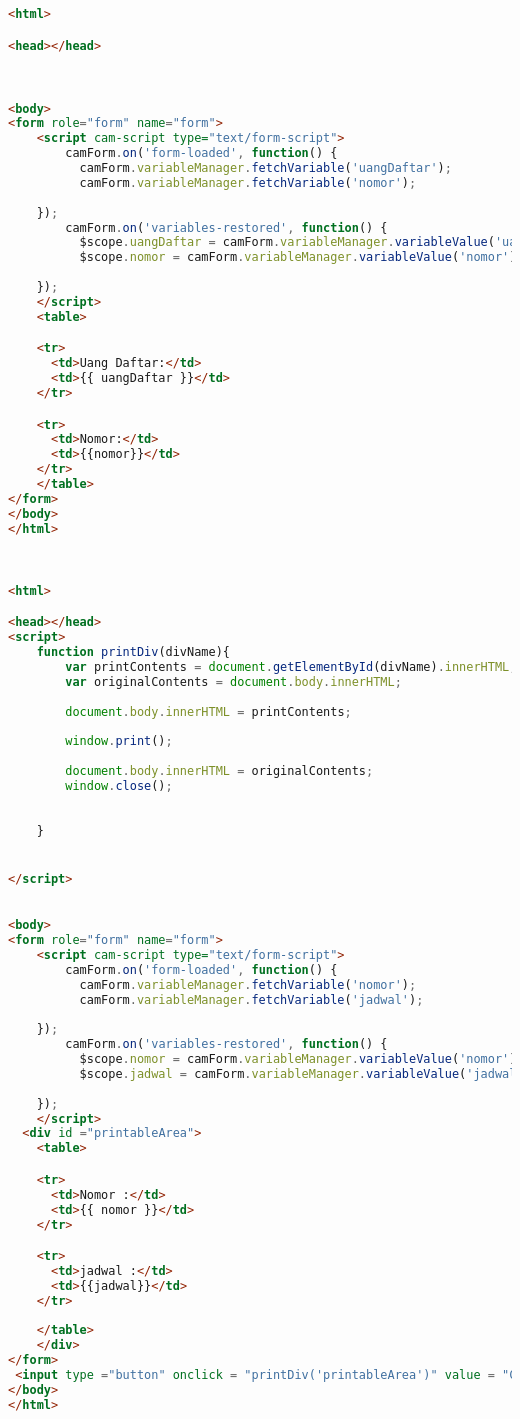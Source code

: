 \begin{lstlisting}[language=html,basicstyle=\tiny,caption=nomor-pembayaran.html]
<html>

<head></head>


	
<body>
<form role="form" name="form">
	<script cam-script type="text/form-script">
    	camForm.on('form-loaded', function() {
	      camForm.variableManager.fetchVariable('uangDaftar');
	      camForm.variableManager.fetchVariable('nomor');
	      
    });
    	camForm.on('variables-restored', function() {
	      $scope.uangDaftar = camForm.variableManager.variableValue('uangDaftar');
	      $scope.nomor = camForm.variableManager.variableValue('nomor');
	      
    });
  	</script>
  	<table>

    <tr>
      <td>Uang Daftar:</td>
      <td>{{ uangDaftar }}</td>
    </tr>

    <tr>
      <td>Nomor:</td>
      <td>{{nomor}}</td>
    </tr>
    </table>
</form> 
</body>
</html>




\end{lstlisting}

\begin{lstlisting}[language=html,basicstyle=\tiny,caption=ringkasan-jadwal.html]
<html>

<head></head>
<script>
	function printDiv(divName){
		var printContents = document.getElementById(divName).innerHTML;
		var originalContents = document.body.innerHTML;
		
		document.body.innerHTML = printContents;
		
		window.print();
		
		document.body.innerHTML = originalContents;
		window.close();
	
	
	}


</script>

	
<body>
<form role="form" name="form">
	<script cam-script type="text/form-script">
    	camForm.on('form-loaded', function() {
	      camForm.variableManager.fetchVariable('nomor');
	      camForm.variableManager.fetchVariable('jadwal');
	      
    });
    	camForm.on('variables-restored', function() {
	      $scope.nomor = camForm.variableManager.variableValue('nomor');
	      $scope.jadwal = camForm.variableManager.variableValue('jadwal');
	      
    });
  	</script>
  <div id ="printableArea">
  	<table>

    <tr>
      <td>Nomor :</td>
      <td>{{ nomor }}</td>
    </tr>

    <tr>
      <td>jadwal :</td>
      <td>{{jadwal}}</td>
    </tr>
    
    </table>
    </div>
</form> 
 <input type ="button" onclick = "printDiv('printableArea')" value = "Cetak Jadwal"/>
</body>
</html>
\end{lstlisting}

